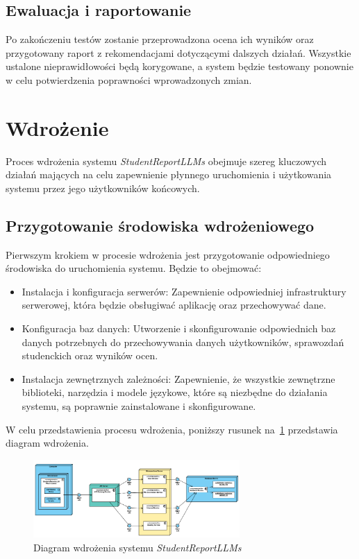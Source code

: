 \documentclass[a4paper, 12pt]{article}
\begin{document}
\subsection{Ewaluacja i raportowanie}

Po zakończeniu testów zostanie przeprowadzona ocena ich wyników oraz przygotowany raport z rekomendacjami dotyczącymi dalszych działań. Wszystkie ustalone nieprawidłowości będą korygowane, a system będzie testowany ponownie w celu potwierdzenia poprawności wprowadzonych zmian.
\newpage

\section{Wdrożenie}
Proces wdrożenia systemu \textit{StudentReportLLMs} obejmuje szereg kluczowych działań mających na celu zapewnienie płynnego uruchomienia i użytkowania systemu przez jego użytkowników końcowych.

\subsection{Przygotowanie środowiska wdrożeniowego}

Pierwszym krokiem w procesie wdrożenia jest przygotowanie odpowiedniego środowiska do uruchomienia systemu. Będzie to obejmować:

\begin{itemize}
    \item Instalacja i konfiguracja serwerów: Zapewnienie odpowiedniej infrastruktury serwerowej, która będzie obsługiwać aplikację oraz przechowywać dane.
    \item Konfiguracja baz danych: Utworzenie i skonfigurowanie odpowiednich baz danych potrzebnych do przechowywania danych użytkowników, sprawozdań studenckich oraz wyników ocen.
    \item Instalacja zewnętrznych zależności: Zapewnienie, że wszystkie zewnętrzne biblioteki, narzędzia i modele językowe, które są niezbędne do działania systemu, są poprawnie zainstalowane i skonfigurowane.
\end{itemize}

W celu przedstawienia procesu wdrożenia, poniższy rusunek na~\ref{fig:wdrozenie} przedstawia diagram wdrożenia.

\begin{figure}[H]
    \centering
    \includegraphics[width=0.7\textwidth]{img/diagram_wdrozenia}
    \caption{Diagram wdrożenia systemu \textit{StudentReportLLMs}}
    \label{fig:wdrozenie}
\end{figure}
\end{document}
